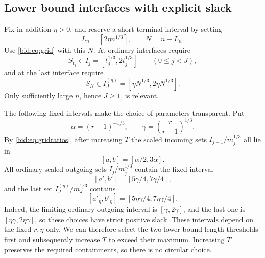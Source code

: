 \documentclass[11pt,letterpaper]{article}
\numberwithin{equation}{section}
\theoremstyle{remark}\newtheorem{remark}[theorem]{Remark}
\newcommand{\ceil}[1]{\left\lceil #1\right\rceil}
\begin{document}
\subsection{Lower bound interfaces with explicit slack}
Fix in addition $\eta>0$, and reserve a short terminal interval by
setting
\begin{equation}\label{bid:eq:tail}
 L_n=\ceil{2\eta n^{1/3}},\qquad N=n-L_n.
\end{equation}
Use \eqref{bid:eq:grid} with this $N$. At ordinary interfaces require
\begin{equation}\label{bid:eq:interfaces}
 S_{t_j}\in I_j=[t_j^{1/3},2t_j^{1/3}]
 \qquad(0\leq j<J),
\end{equation}
and at the last interface require
\begin{equation}\label{bid:eq:lastinterface}
 S_N\in I_J^{(\eta)}=[\eta N^{1/3},2\eta N^{1/3}].
\end{equation}
Only sufficiently large $n$, hence $J\geq1$, is relevant.

The following fixed intervals make the choice of parameters transparent.
Put
\begin{equation}\label{bid:eq:alphagamma}
 \alpha=(r-1)^{-1/3},\qquad
 \gamma=\left(\frac r{r-1}\right)^{1/3}.
\end{equation}
By \eqref{bid:eq:gridratios}, after increasing $T$ the scaled incoming
sets $I_{j-1}/m_j^{1/3}$ all lie in
\begin{equation}\label{bid:eq:incominginterval}
 [a,b]=[\alpha/2,3\alpha].
\end{equation}
All ordinary scaled outgoing sets $I_j/m_j^{1/3}$ contain the fixed
interval
\begin{equation}\label{bid:eq:outgoinginterval}
 [a',b']=[5\gamma/4,7\gamma/4],
\end{equation}
and the last set $I_J^{(\eta)}/m_J^{1/3}$ contains
\begin{equation}\label{bid:eq:lastoutgoing}
 [a'_\eta,b'_\eta]=[5\eta\gamma/4,7\eta\gamma/4].
\end{equation}
Indeed, the limiting ordinary outgoing interval is $[\gamma,2\gamma]$,
and the last one is $[\eta\gamma,2\eta\gamma]$, so these choices have
strict positive slack. These intervals depend on the fixed $r,\eta$
only. We can therefore select the two lower-bound length thresholds
first and subsequently increase $T$ to exceed their maximum. Increasing
$T$ preserves the required containments, so there is no circular choice.
\end{document}
